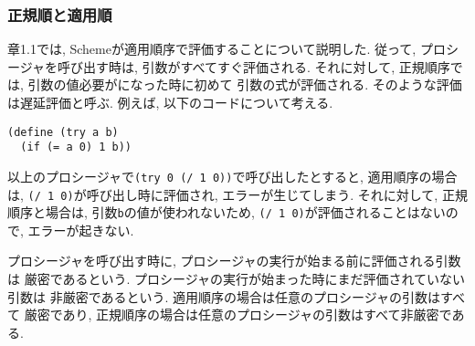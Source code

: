\subsubsection{正規順と適用順}
章1.1では, Schemeが適用順序で評価することについて説明した.
従って, プロシージャを呼び出す時は, 引数がすべてすぐ評価される.
それに対して, 正規順序では, 引数の値必要がになった時に初めて
引数の式が評価される. そのような評価は遅延評価と呼ぶ.
例えば, 以下のコードについて考える.
%
\begin{lstlisting}[basicstyle=\footnotesize]
(define (try a b)
  (if (= a 0) 1 b))
\end{lstlisting}
%
以上のプロシージャで\lstinline{(try 0 (/ 1 0))}で呼び出したとすると,
適用順序の場合は, \lstinline{(/ 1 0)}が呼び出し時に評価され, エラーが生じてしまう.
それに対して, 正規順序と場合は, 引数\lstinline{b}の値が使われないため,
\lstinline{(/ 1 0)}が評価されることはないので, エラーが起きない.

プロシージャを呼び出す時に, プロシージャの実行が始まる前に評価される引数は
厳密であるという. プロシージャの実行が始まった時にまだ評価されていない引数は
非厳密であるという. 適用順序の場合は任意のプロシージャの引数はすべて
厳密であり, 正規順序の場合は任意のプロシージャの引数はすべて非厳密である.

